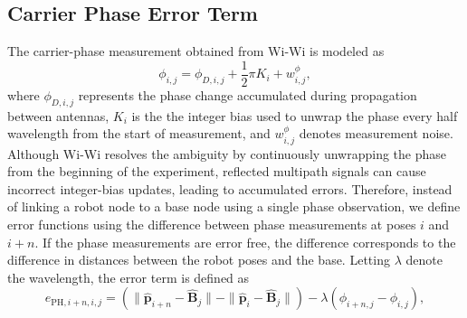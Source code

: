 \documentclass[conference]{IEEEtran}
\begin{document}
\subsection{Carrier Phase Error Term}
The carrier-phase measurement obtained from Wi-Wi is modeled as~\cite{Peng2017}
\begin{equation}
     \phi_{i,j} = \phi_{D,i,j} + \frac{1}{2}\pi K_i + w^{\phi}_{i,j},
\end{equation}
where $\phi_{D,i,j}$ represents the phase change accumulated during propagation between antennas, $K_i$ is the the integer bias used to unwrap the phase every half wavelength from the start of measurement, and $w^{\phi}_{i,j}$ denotes measurement noise.
Although Wi-Wi resolves the ambiguity by continuously unwrapping the phase from the beginning of the experiment, reflected multipath signals can cause incorrect integer-bias updates, leading to accumulated errors.
Therefore, instead of linking a robot node to a base node using a single phase observation, we define error functions using the difference between phase measurements at poses $i$ and $i+n$.
If the phase measurements are error free, the difference corresponds to the difference in distances between the robot poses and the base.
Letting $\lambda$ denote the wavelength, the error term is defined as
\begin{equation}
    e_{\mathrm{PH},i+n,i,j} = \left(\|\mathbf{\hat{p}}_{i+n} - \mathbf{\hat{B}}_j\| - \|\mathbf{\hat{p}}_{i} - \mathbf{\hat{B}}_j\|\right) - \lambda (\phi_{i+n,j} - \phi_{i,j}),
\end{equation}

\end{document}
